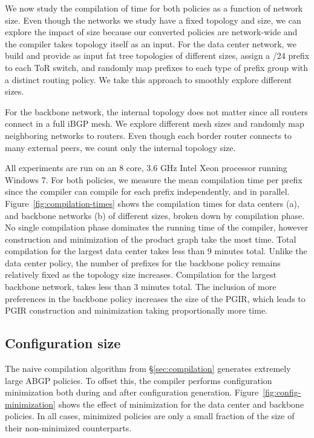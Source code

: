 We now study the compilation of time for both policies as a function of network size. Even though the networks we study have a fixed topology and size, we can explore the impact of size because our converted policies are network-wide and the compiler takes topology itself as an input. For the data center network, we build and provide as input fat tree topologies of different sizes, assign a /24 prefix to each ToR switch, and randomly map prefixes to each type of prefix group with a distinct routing policy. We take this approach to smoothly explore different sizes. 

For the backbone network, the internal topology does not matter since all routers connect in a full iBGP mesh. We explore different mesh sizes and randomly map neighboring networks to routers. Even though each border router connects to many external peers, we count only the internal topology size.

All experiments are run on an 8 core, 3.6 GHz Intel Xeon processor running Windows 7.
%
For both policies, we measure the mean compilation time per prefix since the \sysname compiler can compile for each prefix independently, and in parallel. Figure~\ref{fig:compilation-times} shows the compilation times for data centers (a), and backbone networks (b) of different sizes, broken down by compilation phase. No single compilation phase dominates the running time of the compiler, however construction and minimization of the product graph take the most time. Total compilation for the largest data center takes less than 9 minutes total. Unlike the data center policy, the number of prefixes for the backbone policy remains relatively fixed as the topology size increases. Compilation for the largest backbone network, takes less than 3 minutes total. The inclusion of more preferences in the backbone policy increases the size of the PGIR, which leads to PGIR construction and minimization taking proportionally more time.

\subsection{Configuration size}

The naive compilation algorithm from \S\ref{sec:compilation} generates extremely large ABGP policies. To offset this, the compiler performs configuration minimization both during and after configuration generation. 
Figure~\ref{fig:config-minimization} shows the effect of minimization for the data center and backbone policies. In all cases, minimized policies are only a small fraction of the size of their non-minimized counterparts.


